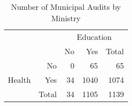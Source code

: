 \begin{table}[!htbp]
  \caption{\label{tab:auditbyministry}Number of Municipal Audits by Ministry}
  \centering
  \scriptsize
  \begin{tabular}{cr|rrr}
    \hline

    \hline
    & & \multicolumn{3}{c}{Education} \T \B \\
    & & No  & Yes  & Total \T \B \\
    \hline
    \multirow[c]{4}{*}{\begin{sideways}Health\end{sideways}} & No    & 0  & 65   & 65   \T \B \\
    & Yes   & 34 & 1040 & 1074 \T \B \\
    & Total & 34 & 1105 & 1139 \T \B \\
    \hline

    \hline
  \end{tabular}
\end{table}
